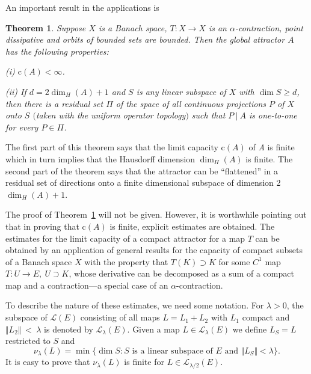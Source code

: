 \documentclass{surv-l}
\theoremstyle{plain}
\newtheorem{theorem}{Theorem}[section]
\theoremstyle{definition}
\numberwithin{equation}{section}
\numberwithin{figure}{chapter}
\begin{document}
An important result in the applications is

\begin{theorem}\label{thm2.8.1} Suppose $X$ is a Banach space, $T\!:X\rightarrow X$ is an $\alpha$-contraction, point dissipative and orbits of bounded sets are bounded. Then the global attractor $A$ has the following properties:

\emph{(i)} $\mathrm{c}(A)<\infty$.

\emph{(ii)} If $d=2\dim_{H}(A)+1$ and $S$ is any linear subspace of $X$ with $\dim S\geq d$, then there is a residual set $\Pi$ of the space of all continuous projections $P$ of $X$ onto $S$ $($taken with the uniform operator topology$)$ such that $P\ |\ A$ is one-to-one for every $ P\in\Pi$.
\end{theorem}

The first part of this theorem says that the limit capacity c$(A)$ of \emph{A} is finite which in turn implies that the Hausdorff dimension $\dim_{H}(A)$ is finite. The second part of the theorem says that the attractor can be ``flattened'' in a residual set of directions onto a finite dimensional subspace of dimension 2 $\dim_{H}(A)+1$.

The proof of Theorem~\ref{thm2.8.1} will not be given. However, it is worthwhile pointing out that in proving that c$(A)$ is finite, explicit estimates are obtained. The estimates for the limit capacity of a compact attractor for a map $T$ can be obtained by an application of general results for the capacity of compact subsets of a Banach space $X$ with the property that $T(K)\supset K$ for some $C^{1}$ map $T\!:U\rightarrow E,\ U\supset K$, whose derivative can be decomposed as a sum of a compact map and a contraction---a special case of an $\alpha$-contraction.

To describe the nature of these estimates, we need some notation. For $\lambda>0$, the subspace of $\mathcal{L}(E)$ consisting of all maps $L=L_{1}+L_{2}$ with $L_{1}$ compact and $\Vert L_{2}\Vert\ <\ \lambda$ is denoted by $\mathcal{L}_{\lambda}(E)$. Given a map $L\in \mathcal{L}_{\lambda}(E)$ we define $L_{S}=L$ restricted to $S$ and
\begin{equation*}
\nu_{\lambda}(L)=\min\{\dim S\!: S \text{ is a linear subspace of } E \text{ and } \Vert L_{S}\Vert<\lambda\}.
\end{equation*}
It is easy to prove that $\nu_{\lambda}(L)$ is finite for $L\in \mathcal{L}_{\lambda/2}(E)$.
\end{document}
